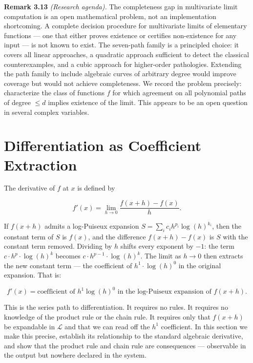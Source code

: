 \documentclass[12pt]{article}
\begin{document}
\textbf{Remark 3.13} \emph{(Research agenda).} The completeness gap in
multivariate limit computation is an open mathematical problem, not an
implementation shortcoming. A complete decision procedure for
multivariate limits of elementary functions --- one that either proves
existence or certifies non-existence for any input --- is not known to
exist. The seven-path family is a principled choice: it covers all
linear approaches, a quadratic approach sufficient to detect the
classical counterexamples, and a cubic approach for higher-order
pathologies. Extending the path family to include algebraic curves of
arbitrary degree would improve coverage but would not achieve
completeness. We record the problem precisely: characterize the class of
functions \(f\) for which agreement on all polynomial paths of degree
\(\leq d\) implies existence of the limit. This appears to be an open
question in several complex variables.




\section{Differentiation as Coefficient
Extraction}\label{differentiation-as-coefficient-extraction}

The derivative of \(f\) at \(x\) is defined by

\[f'(x) = \lim_{h \to 0} \frac{f(x+h) - f(x)}{h}.\]

If \(f(x+h)\) admits a log-Puiseux expansion
\(S = \sum_i c_i h^{p_i} \log(h)^{k_i}\), then the constant term of
\(S\) is \(f(x)\), and the difference \(f(x+h) - f(x)\) is \(S\) with
the constant term removed. Dividing by \(h\) shifts every exponent by
\(-1\): the term \(c \cdot h^p \cdot \log(h)^k\) becomes
\(c \cdot h^{p-1} \cdot \log(h)^k\). The limit as \(h \to 0\) then
extracts the new constant term --- the coefficient of
\(h^1 \cdot \log(h)^0\) in the original expansion. That is:

\[f'(x) = \text{coefficient of } h^1 \log(h)^0 \text{ in the log-Puiseux expansion of } f(x+h).\]

This is the series path to differentiation. It requires no rules. It
requires no knowledge of the product rule or the chain rule. It requires
only that \(f(x+h)\) be expandable in \(\mathcal{L}\) and that we can
read off the \(h^1\) coefficient. In this section we make this precise,
establish its relationship to the standard algebraic derivative, and
show that the product rule and chain rule are consequences ---
observable in the output but nowhere declared in the system.
\end{document}
